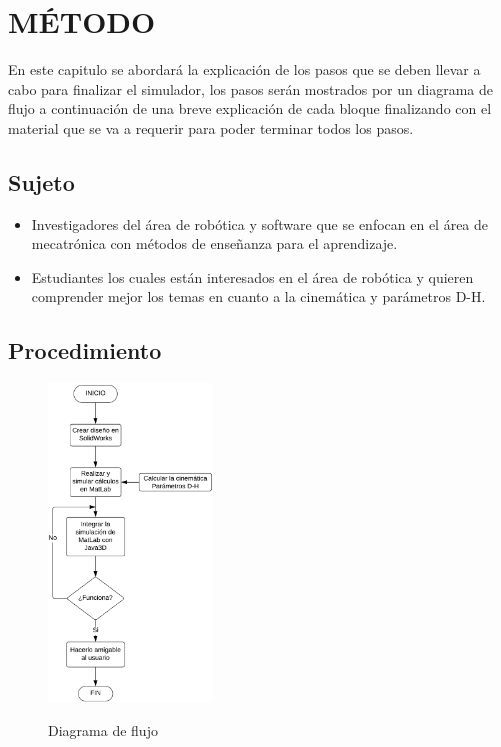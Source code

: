 \renewcommand\thechapter{\Roman{chapter}}
\chapter{MÉTODO} \label{ch:metodo} \thispagestyle{fancy}
\renewcommand\thechapter{\arabic{chapter}}
En este capitulo se abordará la explicación de los pasos que se deben llevar a cabo para finalizar el simulador, los pasos serán mostrados por un diagrama de flujo a continuación de una breve explicación de cada bloque finalizando con el material que se va a requerir para poder terminar todos los pasos.\\

\section{Sujeto}
\begin{itemize}
\item Investigadores del área de robótica y software que se enfocan en el área de mecatrónica con métodos de enseñanza para el aprendizaje.
\item Estudiantes los cuales están interesados en el área de robótica y quieren comprender mejor los temas en cuanto a la cinemática y parámetros D-H.
\end{itemize}

\section{Procedimiento}

\begin{figure}[!h]
\centering
\includegraphics[width=0.39\textwidth, height=0.55\textheight]{./figs/diagramadeflujo}\\
\caption{Diagrama de flujo}
\label{diagramaflujo}
\end{figure}

